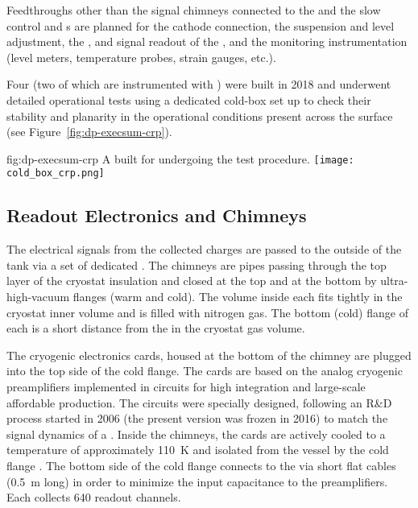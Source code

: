 Feedthroughs other than the signal chimneys connected to the  and the  slow control and \fdth{}s are planned for the cathode  connection, the  suspension and level adjustment, the , and signal readout of the , and the monitoring instrumentation (level meters, temperature probes, strain gauges, etc.).

Four  (two of which are instrumented with ) were built in 2018 and underwent detailed operational tests using a dedicated cold-box set up to check their  stability and planarity in the operational conditions present across the  surface (see Figure~\ref{fig:dp-execsum-crp}). 

\begin{dunefigure}{fig:dp-execsum-crp}
  {A   built for  undergoing the \coldbox test procedure.}
  \texttt{[image: cold\_box\_crp.png]}
\end{dunefigure}



\subsection{Readout Electronics and Chimneys}
\label{sec:dp-execsum-electronics}

The electrical signals from the collected charges are passed to the outside of the tank via a set of dedicated . The chimneys are pipes passing through the top layer of the cryostat insulation and closed at the top and at the bottom by ultra-high-vacuum flanges (warm and cold). The volume inside each  fits tightly in the cryostat inner volume and is filled with nitrogen gas. The bottom (cold) flange of each  is a short distance  from the  in the cryostat gas volume.

The cryogenic  electronics cards, housed at the bottom of the chimney are plugged into the top side of  the cold flange. The  cards are based on the analog cryogenic preamplifiers implemented in   circuits for high integration and large-scale affordable production. 
The  circuits were specially designed, following an R\&D process started in 2006 (the present version was frozen in 2016) to match the signal dynamics of a . Inside the chimneys, the cards are actively cooled to a temperature of approximately \SI{110}{K} and isolated from the  vessel by the cold flange \fdth{}.  The bottom side of the cold flange connects to the  via short flat cables (\SI{0.5}{m} long) in order to minimize the input capacitance to the preamplifiers. Each  collects \num{640} readout channels. 

